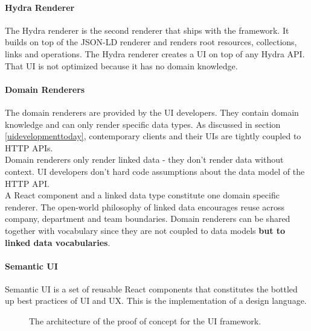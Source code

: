 \paragraph{Hydra Renderer}
The Hydra renderer is the second renderer that ships with the framework. It builds on top of the JSON-LD renderer and renders root resources, collections, links and operations. The Hydra renderer creates a UI on top of any Hydra API. That UI is not optimized because it has no domain knowledge.

\paragraph{Domain Renderers}
The domain renderers are provided by the UI developers. They contain domain knowledge and can only render specific data types. As discussed in section \ref{uidevelopmenttoday}, contemporary clients and their UIs are tightly coupled to HTTP APIs. \\
Domain renderers only render linked data - they don't render data without context. UI developers don't hard code assumptions about the data model of the HTTP API. \\
A React component and a linked data type constitute one domain specific renderer. The open-world philosophy of linked data encourages reuse across company, department and team boundaries. Domain renderers can be shared together with vocabulary since they are not coupled to data models \textbf{but to linked data vocabularies}.

\paragraph{Semantic UI}
Semantic UI is a set of reusable React components that constitutes the bottled up best practices of UI and UX. This is the implementation of a design language.

\begin{figure}[!htb]
  \caption{The architecture of the proof of concept for the UI framework.}
\end{figure}

